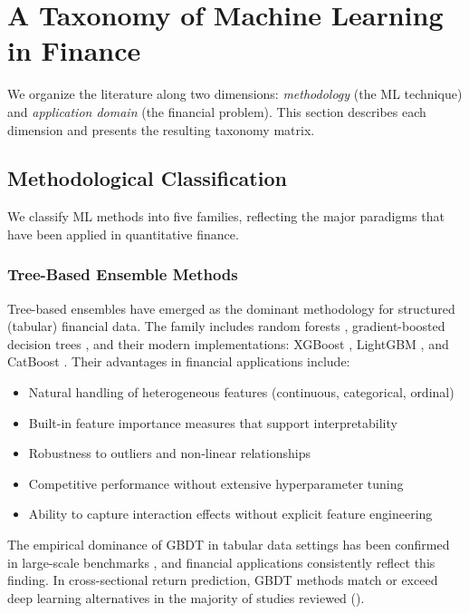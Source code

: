 \section{A Taxonomy of Machine Learning in Finance}\label{sec:taxonomy}

We organize the literature along two dimensions: \textit{methodology} (the ML technique) and \textit{application domain} (the financial problem). This section describes each dimension and presents the resulting taxonomy matrix.

\subsection{Methodological Classification}

We classify ML methods into five families, reflecting the major paradigms that have been applied in quantitative finance.

\subsubsection{Tree-Based Ensemble Methods}

Tree-based ensembles have emerged as the dominant methodology for structured (tabular) financial data. The family includes random forests \citep{Breiman2001}, gradient-boosted decision trees \citep{Friedman2001}, and their modern implementations: XGBoost \citep{Chen2016}, LightGBM \citep{Ke2017}, and CatBoost \citep{Prokhorenkova2018}. Their advantages in financial applications include:

\begin{itemize}[leftmargin=*]
    \item Natural handling of heterogeneous features (continuous, categorical, ordinal)
    \item Built-in feature importance measures that support interpretability
    \item Robustness to outliers and non-linear relationships
    \item Competitive performance without extensive hyperparameter tuning
    \item Ability to capture interaction effects without explicit feature engineering
\end{itemize}

The empirical dominance of GBDT in tabular data settings has been confirmed in large-scale benchmarks \citep{Grinsztajn2022, ShwartzZiv2022alt}, and financial applications consistently reflect this finding. In cross-sectional return prediction, GBDT methods match or exceed deep learning alternatives in the majority of studies reviewed ().

